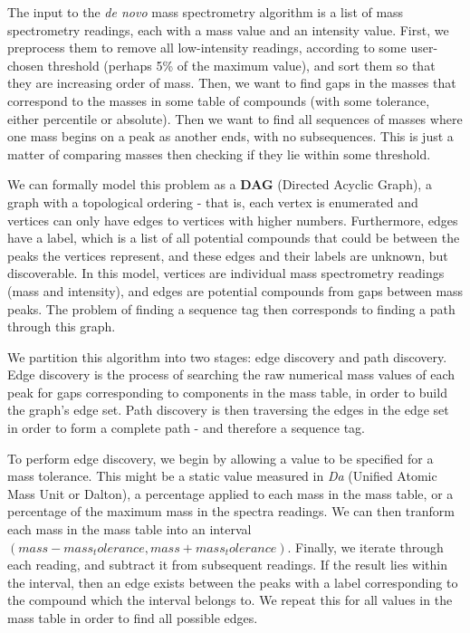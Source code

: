 \documentclass{l4proj}
\begin{document}
The input to the \textit{de novo} mass spectrometry algorithm is a list of mass spectrometry readings, each with a mass value and an intensity value. First, we preprocess them to remove all low-intensity readings, according to some user-chosen threshold (perhaps 5\% of the maximum value), and sort them so that they are increasing order of mass. Then, we want to find gaps in the masses that correspond to the masses in some table of compounds (with some tolerance, either percentile or absolute). Then we want to find all sequences of masses where one mass begins on a peak as another ends, with no subsequences. This is just a matter of comparing masses then checking if they lie within some threshold.

We can formally model this problem as a \textbf{DAG} (Directed Acyclic Graph), a graph with a topological ordering - that is, each vertex is enumerated and vertices can only have edges to vertices with higher numbers. Furthermore, edges have a label, which is a list of all potential compounds that could be between the peaks the vertices represent, and these edges and their labels are unknown, but discoverable. In this model, vertices are individual mass spectrometry readings (mass and intensity), and edges are potential compounds from gaps between mass peaks. The problem of finding a sequence tag then corresponds to finding a path through this graph.

We partition this algorithm into two stages: edge discovery and path discovery. Edge discovery is the process of searching the raw numerical mass values of each peak for gaps corresponding to components in the mass table, in order to build the graph's edge set. Path discovery is then traversing the edges in the edge set in order to form a complete path - and therefore a sequence tag.

To perform edge discovery, we begin by allowing a value to be specified for a mass tolerance. This might be a static value measured in \textit{Da} (Unified Atomic Mass Unit or Dalton), a percentage applied to each mass in the mass table, or a percentage of the maximum mass in the spectra readings. We can then tranform each mass in the mass table into an interval \((mass - mass_tolerance, mass + mass_tolerance)\). Finally, we iterate through each reading, and subtract it from subsequent readings. If the result lies within the interval, then an edge exists between the peaks with a label corresponding to the compound which the interval belongs to. We repeat this for all values in the mass table in order to find all possible edges.
\end{document}
